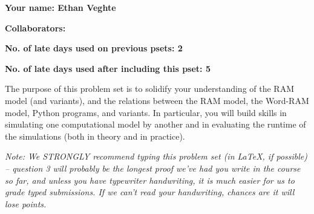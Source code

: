 \documentclass[11pt]{article}
\begin{document}

\textbf{Your name: Ethan Veghte}

\textbf{Collaborators: }

\textbf{No. of late days used on previous psets: 2}

\textbf{No. of late days used after including this pset: 5}


The purpose of this problem set is to solidify your understanding of the RAM model (and variants), and the relations between the RAM model, the Word-RAM model, Python programs, and variants. In particular, you will build skills in simulating one computational model by another and in evaluating the runtime of the simulations (both in theory and in practice).

\textit{Note: We STRONGLY recommend typing this problem set (in LaTeX, if possible) -- question 3 will probably be the longest proof we've had you write in the course so far, and unless you have typewriter handwriting, it is much easier for us to grade typed submissions. If we can't read your handwriting, chances are it will lose points.}
\end{document}
